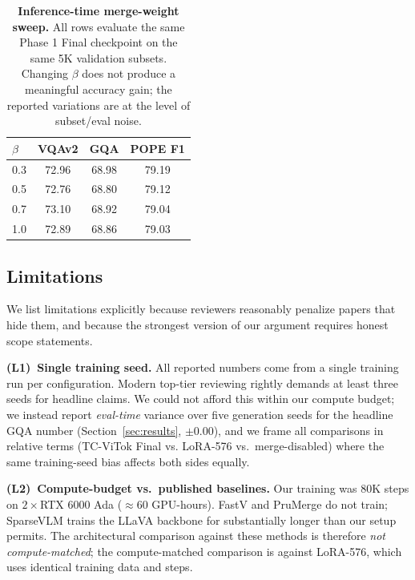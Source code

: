 \documentclass{article}
\begin{document}
\begin{table}[t]
\caption{\textbf{Inference-time merge-weight sweep.}
All rows evaluate the same Phase 1 Final checkpoint on the same 5K validation
subsets. Changing $\beta$ does not produce a meaningful accuracy gain; the
reported variations are at the level of subset/eval noise.}
\label{tab:beta-sweep}
\vskip 0.1in
\centering
\begin{small}
\begin{tabular}{lccc}
\toprule
$\beta$ & \textbf{VQAv2} & \textbf{GQA} & \textbf{POPE F1} \\
\midrule
0.3 & 72.96 & 68.98 & 79.19 \\
0.5 & 72.76 & 68.80 & 79.12 \\
0.7 & 73.10 & 68.92 & 79.04 \\
1.0 & 72.89 & 68.86 & 79.03 \\
\bottomrule
\end{tabular}
\end{small}
\vskip -0.05in
\end{table}

\subsection{Limitations}
\label{sec:limits}

We list limitations explicitly because reviewers reasonably penalize papers
that hide them, and because the strongest version of our argument requires
honest scope statements.

\textbf{(L1)~Single training seed.}
All reported numbers come from a single training run per configuration.
Modern top-tier reviewing rightly demands at least three seeds for headline
claims. We could not afford this within our compute budget; we instead
report \emph{eval-time} variance over five generation seeds for the
headline GQA number (Section~\ref{sec:results}, $\pm$0.00),
and we frame all comparisons in relative terms (TC-ViTok Final vs.
LoRA-576 vs.\ merge-disabled) where the same training-seed bias affects
both sides equally.

\textbf{(L2)~Compute-budget vs.\ published baselines.}
Our training was 80K steps on $2{\times}$RTX 6000 Ada
($\approx$60 GPU-hours). FastV and PruMerge do not train; SparseVLM
trains the LLaVA backbone for substantially longer than our setup permits.
The architectural comparison against these methods is therefore
\emph{not compute-matched}; the compute-matched comparison is against
LoRA-576, which uses identical training data and steps.
\end{document}
